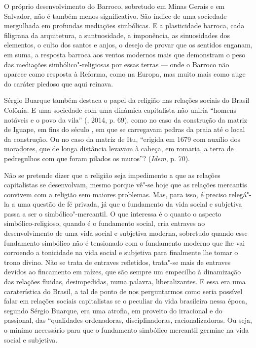 O próprio desenvolvimento do Barroco,
sobretudo em Minas Gerais e em Salvador, não é também menos
significativo. São índice de uma sociedade mergulhada em profundas
mediações simbólicas. E a plasticidade barroca, cada filigrana da
arquitetura, a suntuosidade, a imponência, as sinuosidades dos
elementos, o culto dos santos e anjos, o desejo de provar que os
sentidos enganam, em suma, a resposta barroca aos ventos modernos mais
que demonstram o peso das mediações simbólico"-religiosas por essas
terras --- onde o Barroco não aparece como resposta à Reforma, como na
Europa, mas muito mais como auge do caráter piedoso que aqui
reinava.

Sérgio Buarque também destaca o papel da religião nas relações sociais
do Brasil Colônia. E uma sociedade com uma dinâmica capitalista
não uniria ``homens notáveis e o povo da vila'' (, 2014, p. 69),
como no caso da construção da matriz de Iguape, em fins do século ,
em que se carregavam pedras da praia até o local da construção. Ou no
caso da matriz de Itu, ``erigida em 1679 com auxílio dos moradores, que
de longa distância levavam à cabeça, em romaria, a terra de pedregulhos
com que foram pilados os muros''? (\emph{Idem}, p. 70).

Não se pretende dizer que a religião seja impedimento a que as relações
capitalistas se desenvolvam, mesmo porque vê"-se hoje que as relações
mercantis convivem com a religião sem maiores problemas. Mas, para isso,
é preciso relegá"-la a uma questão de fé privada, já que o fundamento da
vida social e subjetiva passa a ser o simbólico"-mercantil. O que interessa
é o quanto o aspecto simbólico-religioso, quando é o fundamento social,
cria entraves ao desenvolvimento de uma vida social e subjetiva moderna,
sobretudo quando esse fundamento simbólico não é tensionado com o
fundamento moderno que lhe vai corroendo a tonicidade na vida social e
subjetiva para finalmente lhe tomar o trono divino. Não se
trata de entraves refletidos, trata"-se mais de entraves devidos ao
fincamento em raízes, que são sempre um empecilho à dinamização das
relações fluidas, desimpedidas, numa palavra, liberalizantes. E essa era
uma caraterística do Brasil, a tal de ponto de nos perguntarmos como
seria possível falar em relações sociais capitalistas se o peculiar da
vida brasileira nessa época, segundo Sérgio Buarque, era uma atrofia, em
proveito do irracional e do passional, das ``qualidades ordenadoras,
disciplinadoras, racionalizadoras. Ou seja, o mínimo necessário para
que o fundamento simbólico mercantil germine na vida social e subjetiva.

